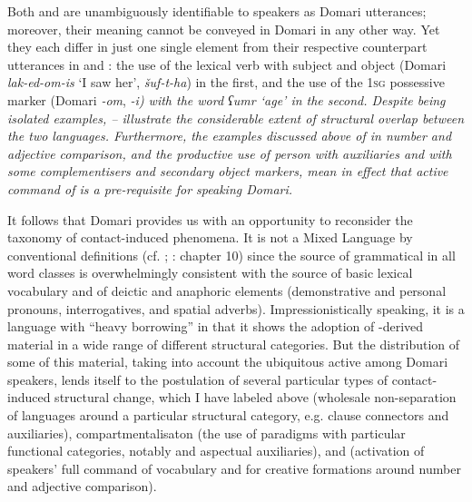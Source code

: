 \documentclass[output=paper]{langsci/langscibook}
\begin{document}
Both  and  are unambiguously identifiable to speakers as Domari utterances; moreover, their meaning cannot be conveyed in Domari in any other way. Yet they each differ in just one single element from their respective counterpart  utterances in  and : the use of the lexical verb with subject and object  (Domari \textit{lak-ed-om-is} ‘I saw her’,  \textit{šuf-t-ha}) in the first, and the use of the \textsc{1sg} possessive marker (Domari \-\textit{{}-om},  \textit{-i\textup{) with the word} ʕumr \textup{‘age’ in the second. Despite being isolated examples, – illustrate the considerable extent of structural overlap between the two languages. Furthermore, the examples discussed above of  in number  and adjective comparison, and the productive use of  person   with auxiliaries and with some complementisers and secondary object markers, mean in effect that active command of  is a pre-req\-ui\-site for speaking Domari.}}

It follows that Domari provides us with an opportunity to reconsider the taxonomy of contact-induced  phenomena. It is not a Mixed Language by conventional definitions (cf. \citealt{BakkerMatras2013}; \citealt{Matras2009}: chapter 10) since the  source of grammatical  in all word classes is overwhelmingly consistent with the source of basic lexical vocabulary and of deictic and anaphoric elements (demonstrative and personal pronouns, interrogatives, and spatial adverbs). Impressionistically speaking, it is a language with ``heavy borrowing'' in that it shows the adoption of -derived material in a wide range of different structural categories. But the distribution of some of this material, taking into account the ubiquitous active  among Domari speakers,  lends itself to the postulation of several particular types of contact-induced structural change, which I have labeled above  (wholesale non-separation of languages around a particular structural category, e.g. clause connectors and  auxiliaries),  compartmentalisaton (the use of   paradigms with particular functional categories, notably  and aspectual auxiliaries), and  (activation of speakers’ full command of  vocabulary and  for creative formations around number  and adjective comparison).
\end{document}
